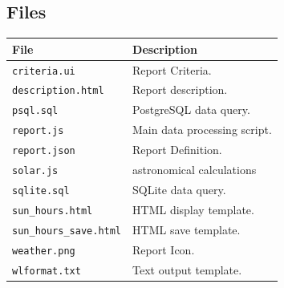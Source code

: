 \documentclass[a4paper,10pt]{book}
\newcommand{\partnumber}{\ifthenelse{\isundefined{\projectnum}}{}{\projectnum-\docnum	\ifthenelse{\equal{\docrev}{001}}{}{.\docrev}}}
\newcommand*\cleartoleftpage{%
  \clearpage
  \ifodd\value{page}\hbox{}\newpage\fi
}
\begin{document}
\subsection{Files}
\begin{tabular}{p{3.8cm} p{10cm}}
\hline
\textbf{File} & \textbf{Description} \\
\hline
\verb|criteria.ui| & Report Criteria.\\
\verb|description.html| & Report description. \\
\verb|psql.sql| & PostgreSQL data query.\\
\verb|report.js| & Main data processing script. \\
\verb|report.json| & Report Definition.\\
\verb|solar.js| & astronomical calculations \\
\verb|sqlite.sql| & SQLite data query. \\
\verb|sun_hours.html| & HTML display template.\\
\verb|sun_hours_save.html| & HTML save template.\\
\verb|weather.png| & Report Icon.\\
\verb|wlformat.txt| & Text output template.\\
\hline
\end{tabular}



\cleartoleftpage
\thispagestyle{empty}
\begin{flushright}
\null
\vfill
\tt \partnumber
\end{flushright}
\end{document}
